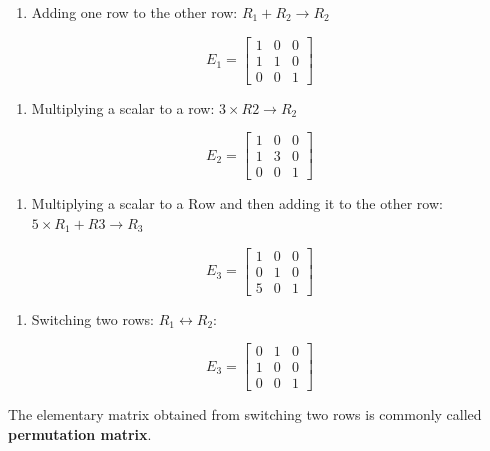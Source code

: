\documentclass[
]{book}
\providecommand{\tightlist}{%
  \setlength{\itemsep}{0pt}\setlength{\parskip}{0pt}}
\begin{document}
\begin{enumerate}
\def\labelenumi{\arabic{enumi}.}
\tightlist
\item
  Adding one row to the other row: \(R_1 + R_2 \to R_2\)
\end{enumerate}

\[
E_1 = \left[\begin{array}{ccccc} 
1 & 0 &  0  \\ 
1 & 1 & 0  \\ 
0 & 0 & 1  
\end{array}
\right]
\]

\begin{enumerate}
\def\labelenumi{\arabic{enumi}.}
\setcounter{enumi}{1}
\tightlist
\item
  Multiplying a scalar to a row: \(3\times R2 \to R_2\)
\end{enumerate}

\[
E_2 = \left[\begin{array}{ccccc} 
1 & 0 &  0  \\ 
1 & 3 & 0  \\ 
0 & 0 & 1  
\end{array}
\right]
\]

\begin{enumerate}
\def\labelenumi{\arabic{enumi}.}
\setcounter{enumi}{2}
\tightlist
\item
  Multiplying a scalar to a Row and then adding it to the other row: \(5\times R_1 + R3 \to R_3\)
\end{enumerate}

\[
E_3 = \left[\begin{array}{ccccc} 
1 & 0 &  0  \\ 
0 & 1 & 0  \\ 
5 & 0 & 1  
\end{array}
\right]
\]

\begin{enumerate}
\def\labelenumi{\arabic{enumi}.}
\setcounter{enumi}{3}
\tightlist
\item
  Switching two rows: \(R_1 \leftrightarrow R_2\):
\end{enumerate}

\[
E_3 = \left[\begin{array}{ccccc} 
0 & 1 &  0  \\ 
1 & 0 & 0  \\ 
0 & 0 & 1  
\end{array}
\right]
\]

The elementary matrix obtained from switching two rows is commonly called \textbf{permutation matrix}.
\end{document}
